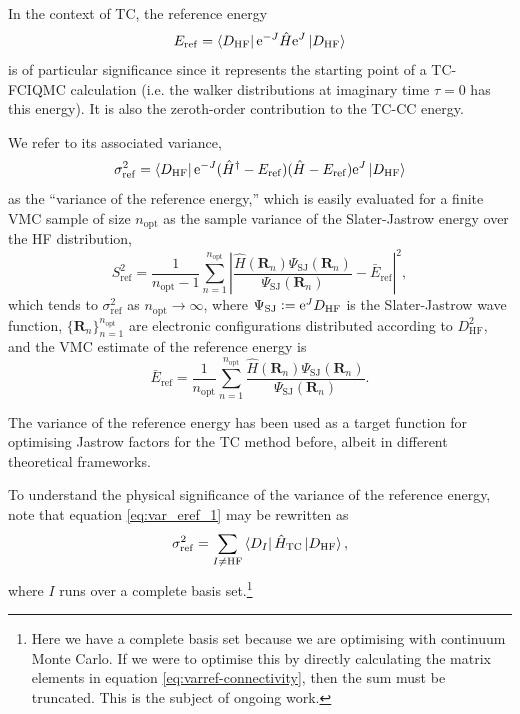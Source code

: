 In the context of TC, the reference energy
\begin{equation}
    E_\mathrm{ref} = \bra{D_\mathrm{HF}}\mathrm{e}^{-J}\hat H\mathrm{e}^J\ket{D_\mathrm{HF}}
\end{equation}
is of particular significance since it represents the starting point of a TC-FCIQMC calculation (i.e. the walker distributions at imaginary time $\tau=0$ has this energy). It is also the zeroth-order contribution to the TC-\gls{CC} energy.

We refer to its associated variance,
\begin{equation}
  \label{eq:var_eref_1}
  \sigma_\mathrm{ref}^2 =
    \bra{D_\mathrm{HF}}\mathrm{e}^{-J} (\hat H^\dag-E_\mathrm{ref})(\hat H-E_\mathrm{ref}) \mathrm{e}^J\ket{D_\mathrm{HF}}
\end{equation}
as the ``variance of the reference energy,'' which is easily evaluated for a finite VMC sample of size $n_\mathrm{opt}$ as the sample variance of the Slater-Jastrow energy over the HF distribution,
\begin{equation}
    S_\mathrm{ref}^2 =
      \frac 1 {n_\mathrm{opt}-1}
      \sum_{n=1}^{n_\mathrm{opt}}
        \left| \frac {\hat H({\bm R}_n) \Psi_\mathrm{SJ}({\bm R}_n)}
                     {\Psi_\mathrm{SJ}({\bm R}_n)} - {\bar E}_\mathrm{ref}
        \right|^2,
\end{equation}
which tends to $\sigma_\mathrm{ref}^2$ as $n_\mathrm{opt}\to\infty$, where $\Psi_\mathrm{SJ}\mathrel{\mathop:}= \mathrm{e}^JD_\mathrm{HF}$ is the Slater-Jastrow wave function, $\{{\bm R}_n\}_{n=1}^{n_\mathrm{opt}}$ are electronic
configurations distributed according to $D_\mathrm{HF}^2$, and the VMC
estimate of the reference energy is
\begin{equation}
    {\bar E}_\mathrm{ref} =
      \frac 1 {n_\mathrm{opt}}
      \sum_{n=1}^{n_\mathrm{opt}}
        \frac {\hat H({\bm R}_n) \Psi_\mathrm{SJ}({\bm R}_n)}
              {\Psi_\mathrm{SJ}({\bm R}_n)}.
\end{equation}

The variance of the reference energy has been used as a target function for optimising Jastrow factors for the TC method before, albeit in different theoretical frameworks.\supercite{handyMinimization1971,umezawaTranscorrelated2003}

To understand the physical significance of the variance of the reference energy, note that equation \ref{eq:var_eref_1} may be rewritten as
\begin{equation}
    \label{eq:varref-connectivity}
    \sigma_\mathrm{ref}^2 = \sum_{I\neq \mathrm{HF}}\bra{D_I}\hat H_\mathrm{TC}\ket{D_\mathrm{HF}},
\end{equation}
where $I$ runs over a complete basis set.\footnote{Here we have a complete basis set because we are optimising with continuum Monte Carlo. If we were to optimise this by directly calculating the matrix elements in equation \ref{eq:varref-connectivity}, then the sum must be truncated. This is the subject of ongoing work.}

